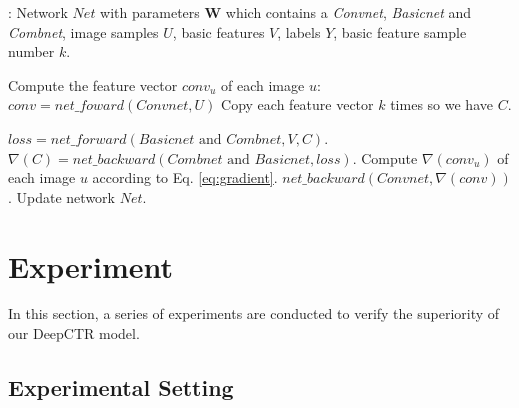 \documentclass{sig-alternate-05-2015}
\begin{document}
\begin{algorithm}[tb]
	\caption{$forward\_backward$}
	\label{alg:fb}
	\begin{algorithmic}[1]
		\renewcommand{\algorithmicrequire}{\textbf{Input:}}
		\renewcommand{\algorithmicensure}{\textbf{Output:}}
		\Require: Network $Net$ with parameters $\mathbf{W}$ which contains a \emph{Convnet}, \emph{Basicnet} and \emph{Combnet}, image samples $U$, basic features $V$, labels $Y$, basic feature sample number $k$. 
		
		
		
		\State Compute the feature vector $conv_{u}$ of each image $u$:
		$
		conv = net\_foward(Convnet, U)
		$
		\State Copy each feature vector $k$ times so we have $C$.
		
		\State  $loss = net\_forward(Basicnet \text{ and } Combnet, V, C)$.
		\State  $\nabla(C) = net\_backward(Combnet \text{ and } Basicnet, loss)$.
		\State Compute $\nabla(conv_{u})$ of each image $u$ according to Eq. \ref{eq:gradient}.
		\State $net\_backward(Convnet, \nabla(conv))$.
		\State Update network $Net$.
	\end{algorithmic}
\end{algorithm}  
\section{Experiment}
In this section, a series of experiments are conducted to verify the superiority of our DeepCTR model.
\subsection{Experimental Setting}
\end{document}
